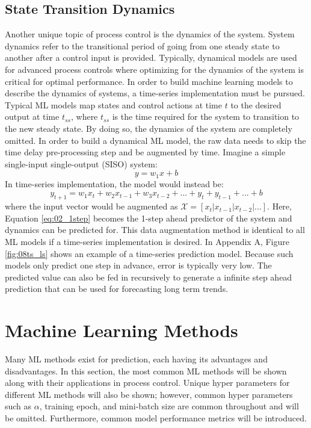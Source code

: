 \subsection{State Transition Dynamics}
Another unique topic of process control is the dynamics of the system. System dynamics refer to the transitional period of going from one steady state to another after a control input is provided. Typically, dynamical models are used for advanced process controls where optimizing for the dynamics of the system is critical for optimal performance.  In order to build machine learning models to describe the dynamics of systems, a time-series implementation must be pursued.  Typical ML models map states and control actions at time $t$ to the desired output at time $t_{ss}$, where $t_{ss}$ is the time required for the system to transition to the new steady state.  By doing so, the dynamics of the system are completely omitted.  In order to build a dynamical ML model, the raw data needs to skip the time delay pre-processing step and be augmented by time.  Imagine a simple single-input single-output (SISO) system:
\begin{equation}
    y = w_1x + b
\end{equation}
In time-series implementation, the model would instead be:
\begin{equation}
    y_{t + 1} = w_1x_{t} + w_2x_{t - 1} + w_3x_{t - 2} + ... + y_{t} + y_{t - 1} + ... + b
    \label{eq:02_1step}
\end{equation}
where the input vector would be augmented as $\mathcal{X} = [x_{t} | x_{t - 1} | x_{t - 2} | ... ]$. Here, Equation \ref{eq:02_1step} becomes the 1-step ahead predictor of the system and dynamics can be predicted for. This data augmentation method is identical to all ML models if a time-series implementation is desired. In Appendix A, Figure \ref{fig:08ts_ls} shows an example of a time-series prediction model.  Because such models only predict one step in advance, error is typically very low.  The predicted value can also be fed in recursively to generate a infinite step ahead prediction that can be used for forecasting long term trends.

\section{Machine Learning Methods}

Many ML methods exist for prediction, each having its advantages and disadvantages. In this section, the most common ML methods will be shown along with their applications in process control.  Unique hyper parameters for different ML methods will also be shown; however, common hyper parameters such as $\alpha$, training epoch, and mini-batch size are common throughout and will be omitted.  Furthermore, common model performance metrics will be introduced. 

